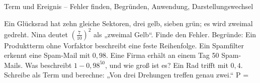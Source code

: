 \begin{aufgabe}{Term und Ereignis – Fehler finden, Begründen, Anwendung, Darstellungswechsel}
\begin{teile}
\teil Ein Glücksrad hat zehn gleiche Sektoren, drei gelb, sieben grün; es wird zweimal gedreht. Nina deutet $\left(\frac{7}{10}\right)^2$ als „zweimal Gelb“. Finde den Fehler.
\teil Begründe: Ein Produktterm ohne Vorfaktor beschreibt eine feste Reihenfolge.
\teil Ein Spamfilter erkennt eine Spam-Mail mit $0{,}98$. Eine Firma erhält an einem Tag 50 Spam-Mails. Was beschreibt $1 - 0{,}98^{50}$, und wie groß ist es?
\teil Ein Rad trifft mit $0{,}4$. Schreibe als Term und berechne: „Von drei Drehungen treffen genau zwei.“ P = \leerfeld
\end{teile}
\end{aufgabe}
